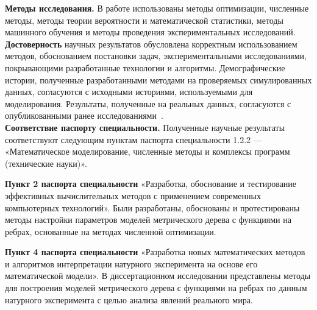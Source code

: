 \textbf{Методы исследования.} В работе использованы методы оптимизации, численные методы, методы теории вероятности и математической статистики, методы машинного обучения и методы проведения экспериментальных
исследований.\\

\textbf{Достоверность} научных результатов обусловлена корректным использованием методов, обоснованием постановки задач, экспериментальными исследованиями, покрывающими разработанные технологии и алгоритмы.
Демографические истории, полученные разработанными методами на проверяемых симулированных данных, согласуются с исходными историями, используемыми для моделирования. Результаты, полученные на реальных данных, согласуются с опубликованными ранее исследованиями~\cite{gutenkunst2009inferring, jouganous2017inferring, nielsen2017tracing, verissimo2017world, king2015genetic, сивцева2020геном}.\\

\textbf{Соответствие паспорту специальности.}
Полученные научные результаты соответствуют следующим пунктам паспорта специальности 1.2.2 --- «Математическое моделирование, численные методы и комплексы программ (технические науки)».

\textbf{Пункт 2 паспорта специальности} «Разработка, обоснование и тестирование эффективных вычислительных методов с применением современных компьютерных технологий».
Были разработаны, обоснованы и протестированы методы настройки параметров моделей метрического дерева с функциями на ребрах, основанные на методах численной оптимизации.


\textbf{Пункт 4  паспорта специальности} «Разработка новых математических методов и алгоритмов интерпретации натурного эксперимента на основе его математической модели».
В диссертационном исследовании представлены методы для построения моделей метрического дерева с функциями на ребрах по данным натурного эксперимента с целью анализа явлений реального мира.\\



